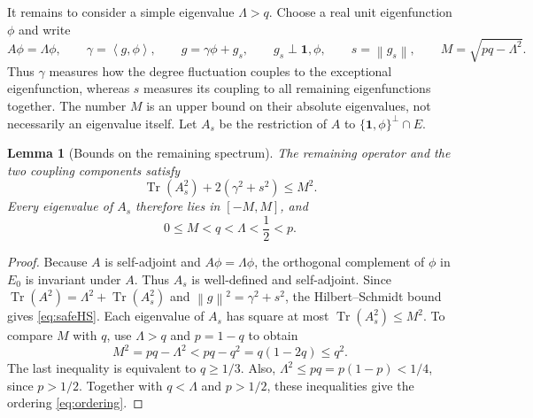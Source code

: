 \documentclass[11pt]{article}
\numberwithin{equation}{section}
\newtheorem{lemma}[theorem]{Lemma}
\newcommand{\Tr}{\operatorname{Tr}}
\newcommand{\one}{\mathbf 1}
\newcommand{\norm}[1]{\left\lVert #1\right\rVert}
\newcommand{\ip}[2]{\left\langle #1,#2\right\rangle}
\begin{document}
It remains to consider a simple eigenvalue $\Lambda>q$. Choose a real unit eigenfunction $\phi$ and write
\begin{equation}\label{eq:split}
 A\phi=\Lambda\phi,\qquad
 \gamma=\ip g\phi,\qquad g=\gamma\phi+g_s,\qquad
 g_s\perp\one,\phi,\qquad
 s=\norm{g_s},\qquad M=\sqrt{pq-\Lambda^2}.
\end{equation}
Thus $\gamma$ measures how the degree fluctuation couples to the
exceptional eigenfunction, whereas $s$ measures its coupling to all
remaining eigenfunctions together. The number $M$ is an upper bound on
their absolute eigenvalues, not necessarily an eigenvalue itself.
Let $A_s$ be the restriction of $A$ to $\{\one,\phi\}^\perp\cap E$.
\begin{lemma}[Bounds on the remaining spectrum]\label{lem:remaining-spectrum}
The remaining operator and the two coupling components satisfy
\begin{equation}\label{eq:safeHS}
 \Tr(A_s^2)+2(\gamma^2+s^2)\le M^2.
\end{equation}
Every eigenvalue of $A_s$ therefore lies in $[-M,M]$, and
\begin{equation}\label{eq:ordering}
 0\le M<q<\Lambda<\frac12<p.
\end{equation}
\end{lemma}
\begin{proof}
Because $A$ is self-adjoint and $A\phi=\Lambda\phi$, the
orthogonal complement of $\phi$ in $E_0$ is invariant under $A$.
Thus $A_s$ is well-defined and self-adjoint. Since
$\Tr(A^2)=\Lambda^2+\Tr(A_s^2)$ and
$\norm g^2=\gamma^2+s^2$, the Hilbert--Schmidt bound gives
\eqref{eq:safeHS}. Each eigenvalue of $A_s$ has square at most
$\Tr(A_s^2)\le M^2$. To compare $M$ with $q$, use $\Lambda>q$
and $p=1-q$ to obtain
\[
 M^2=pq-\Lambda^2<pq-q^2=q(1-2q)\le q^2.
\]
The last inequality is equivalent to $q\ge1/3$. Also,
$\Lambda^2\le pq=p(1-p)<1/4$, since $p>1/2$.
Together with $q<\Lambda$ and $p>1/2$, these inequalities give
the ordering \eqref{eq:ordering}.
\end{proof}
\end{document}
